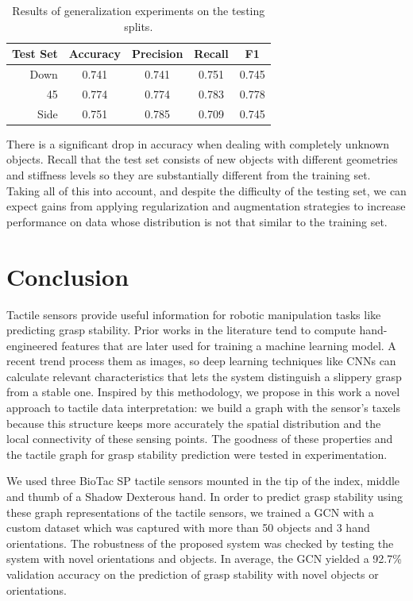 \begin{table}[!htb]
  \centering
    \caption{Results of generalization experiments on the testing splits.}
    \label{table:generalization_tests}
    \begin{tabular}{r|cccc}
        \hline
        \textbf{Test Set} & \textbf{Accuracy} & \textbf{Precision} & \textbf{Recall} & \textbf{F1}\\
        \hline
        Down & 0.741 & 0.741 & 0.751 & 0.745\\
        45 & 0.774 & 0.774 & 0.783 & 0.778\\
        Side & 0.751 & 0.785 & 0.709 & 0.745\\
        \hline
    \end{tabular}
\end{table}

There is a significant drop in accuracy when dealing with completely unknown objects. Recall that the test set consists of new objects with different geometries and stiffness levels so they are substantially different from the training set. Taking all of this into account, and despite the difficulty of the testing set, we can expect gains from applying regularization and augmentation strategies to increase performance on data whose distribution is not that similar to the training set.

\section{Conclusion}
\label{cha:tactile:sec:conclusion}

Tactile sensors provide useful information for robotic manipulation tasks like predicting grasp stability. Prior works in the literature tend to compute hand-engineered features that are later used for training a machine learning model. A recent trend process them as images, so deep learning techniques like \acsp{CNN} can calculate relevant characteristics that lets the system distinguish a slippery grasp from a stable one. Inspired by this methodology, we propose in this work a novel approach to tactile data interpretation: we build a graph with the sensor's taxels because this structure keeps more accurately the spatial distribution and the local connectivity of these sensing points. The goodness of these properties and the tactile graph for grasp stability prediction were tested in experimentation.

We used three BioTac SP tactile sensors mounted in the tip of the index, middle and thumb of a Shadow Dexterous hand. In order to predict grasp stability using these graph representations of the tactile sensors, we trained a \ac{GCN} with a custom dataset which was captured with more than 50 objects and 3 hand orientations. The robustness of the proposed system was checked by testing the system with novel orientations and objects. In average, the \ac{GCN} yielded a 92.7\% validation accuracy on the prediction of grasp stability with novel objects or orientations.

